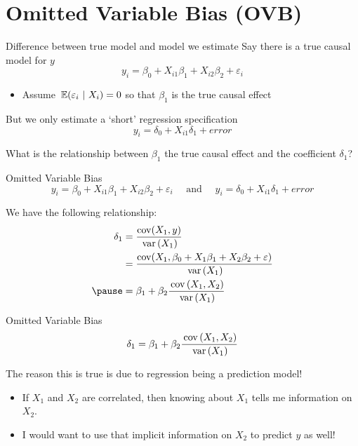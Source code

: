 \documentclass[aspectratio=169,t,11pt,table]{beamer}
\begin{document}
\section{Omitted Variable Bias (OVB)}

\begin{frame}{Difference between true model and model we estimate}
  Say there is a true causal model for $y$
  $$
    y_i = \beta_0 + X_{i1} \beta_1 + X_{i2} \beta_2 + \varepsilon_i
  $$
  \begin{itemize}
    \item Assume $\expec{\varepsilon_i}{X_i} = 0$ so that $\beta_1$ is the true causal effect
  \end{itemize}
  
  \pause
  \bigskip
  But we only estimate a `short' regression specification
  $$
    y_i = \delta_0 + X_{i1} \delta_1 + error
  $$

  \bigskip
  What is the relationship between $\beta_1$ the true causal effect and the coefficient $\delta_1$?
\end{frame}

\begin{frame}{Omitted Variable Bias}
  \vspace*{-\bigskipamount}
  $$
  y_i = \beta_0 + X_{i1} \beta_1 + X_{i2} \beta_2 + \varepsilon_i \quad\text{ and }\quad y_i = \delta_0 + X_{i1} \delta_1 + error
  $$

  We have the following relationship:
  \begin{align*}
    \delta_1 
    &= \frac{\cov(X_1, y)}{\var{X_1}} \\
    &= \frac{\cov(X_1, \beta_0 + X_{1} \beta_1 + X_{2} \beta_2 + \varepsilon)}{\var{X_1}} \\ \pause
    &= \beta_1 + \beta_2 \frac{\cov{X_1, X_2}}{\var{X_1}} 
  \end{align*}
\end{frame}

\begin{frame}{Omitted Variable Bias}
  $$
    \delta_1 = \beta_1 + \beta_2 \frac{\cov{X_1, X_2}}{\var{X_1}} 
  $$

  The reason this is true is due to regression being a prediction model!
  \begin{itemize}
    \item If $X_1$ and $X_2$ are correlated, then knowing about $X_1$ tells me information on $X_2$.
    
    \item I would want to use that implicit information on $X_2$ to predict $y$ as well! 
  \end{itemize}
\end{frame}
\end{document}
